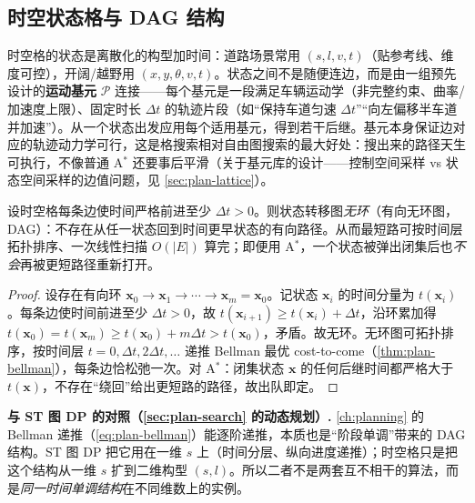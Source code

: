 \subsection{时空状态格与 DAG 结构}
\label{sec:stc-dag}

时空格的状态是离散化的构型加时间：道路场景常用 $(s,l,v,t)$（贴参考线、维度可控），开阔/越野用 $(x,y,\theta,v,t)$。状态之间不是随便连边，而是由一组预先设计的\textbf{运动基元} $\mathcal{P}$ 连接——每个基元是一段满足车辆运动学（非完整约束、曲率/加速度上限）、固定时长 $\Delta t$ 的轨迹片段（如“保持车道匀速 $\Delta t$”“向左偏移半车道并加速”）。从一个状态出发应用每个适用基元，得到若干后继。基元本身保证边对应的轨迹动力学可行，这是格搜索相对自由图搜索的最大好处：搜出来的路径天生可执行，不像普通 A$^*$ 还要事后平滑（关于基元库的设计——控制空间采样 vs 状态空间采样的边值问题，见 \cref{sec:plan-lattice}）。

\begin{theorem}[时空格是有向无环图]\label{thm:stc-dag}
设时空格每条边使时间严格前进至少 $\Delta t>0$。则状态转移图\emph{无环}（有向无环图，DAG）：不存在从任一状态回到时间更早状态的有向路径。从而最短路可按时间层拓扑排序、一次线性扫描 $O(|E|)$ 算完；即便用 A$^*$，一个状态被弹出闭集后也\emph{不会}再被更短路径重新打开。
\end{theorem}
\begin{proof}
设存在有向环 $\mathbf{x}_0\to\mathbf{x}_1\to\cdots\to\mathbf{x}_m=\mathbf{x}_0$。记状态 $\mathbf{x}_i$ 的时间分量为 $t(\mathbf{x}_i)$。每条边使时间前进至少 $\Delta t>0$，故 $t(\mathbf{x}_{i+1})\ge t(\mathbf{x}_i)+\Delta t$，沿环累加得 $t(\mathbf{x}_0)=t(\mathbf{x}_m)\ge t(\mathbf{x}_0)+m\Delta t>t(\mathbf{x}_0)$，矛盾。故无环。无环图可拓扑排序，按时间层 $t=0,\Delta t,2\Delta t,\dots$ 递推 Bellman 最优 cost-to-come（\cref{thm:plan-bellman}），每条边恰松弛一次。对 A$^*$：闭集状态 $\mathbf{x}$ 的任何后继时间都严格大于 $t(\mathbf{x})$，不存在“绕回”给出更短路的路径，故出队即定。
\end{proof}

\begin{note}
\textbf{与 ST 图 DP 的对照（\cref{sec:plan-search} 的动态规划）.}\;
\cref{ch:planning} 的 Bellman 递推（\cref{eq:plan-bellman}）能逐阶递推，本质也是“阶段单调”带来的 DAG 结构。ST 图 DP 把它用在一维 $s$ 上（时间分层、纵向进度递推）；时空格只是把这个结构从一维 $s$ 扩到二维构型 $(s,l)$。所以二者不是两套互不相干的算法，而是\emph{同一时间单调结构}在不同维数上的实例。
\end{note}

